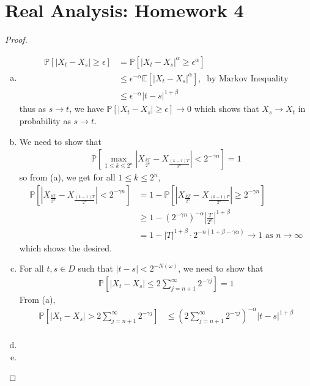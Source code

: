 \documentclass[a4paper,12pt]{article}
\theoremstyle{definition}
\begin{document}
\section*{Real Analysis: Homework 4}


\begin{proof}
\hspace{1em}
\begin{enumerate}[(a)]
\item  
\begin{align*}
\mathbb{P}[|X_t-X_s|\geq \epsilon] &= \mathbb{P}[|X_t-X_s|^\alpha\geq \epsilon^\alpha]\\
&\leq \epsilon^{-\alpha}\mathbb{E}[|X_t-X_s|^\alpha],~ \text{ by Markov Inequality}\\
& \leq  \epsilon^{-\alpha}|t-s|^{1+\beta}
\end{align*}
thus as $s \to t$, we have $\mathbb{P}[|X_t-X_s|\geq \epsilon] \to 0$ which shows that $X_s \to X_t$ in probability as $s \to t$.


\item We need to show that 
\begin{align*}
\mathbb{P}\left[\max_{1 \leq k \leq 2^n}\left|X_{\frac{kT}{2^n}}-X_{\frac{(k-1)T}{2^n}}\right|<2^{-\gamma n}\right]=1
\end{align*}
so from (a), we get for all $1 \leq k \leq 2^n$,
\begin{align*}
\mathbb{P}\left[\left|X_{\frac{kT}{2^n}}-X_{\frac{(k-1)T}{2^n}}\right|<2^{-\gamma n}\right] &= 1- \mathbb{P}\left[\left|X_{\frac{kT}{2^n}}-X_{\frac{(k-1)T}{2^n}}\right|\geq 2^{-\gamma n}\right]\\
& \geq 1 - (2^{-\gamma n})^{-\alpha}\left|\frac{T}{2^n}\right|^{1+\beta}\\
& = 1 - |T|^{1+\beta}\cdot 2^{-n(1+\beta-\gamma\alpha)} \to 1 \text{ as } n \to \infty 
\end{align*}
which shows the desired.

\item
For all $t,s \in D$ such that $|t-s| < 2^{-N(\omega)}$, we need to show that
\begin{align*}
\mathbb{P}\left[\left|X_t - X_s\right| \leq 2 \sum_{j=n+1}^{\infty}2^{-\gamma j}\right] = 1
\end{align*}
From (a), 
\begin{align*}
\mathbb{P}\left[\left|X_t - X_s\right| > 2 \sum_{j=n+1}^{\infty}2^{-\gamma j}\right] &\leq \left(2 \sum_{j=n+1}^{\infty}2^{-\gamma j}\right)^{-\alpha}|t-s|^{1+\beta}\\
\end{align*}






\item



\item







\end{enumerate}

\end{proof}
\end{document}

